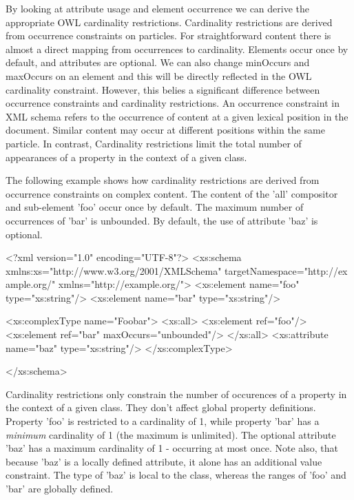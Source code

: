 By looking at attribute usage and element occurrence we can derive the appropriate OWL cardinality restrictions. Cardinality restrictions are derived from occurrence constraints on particles. For straightforward content there is almost a direct mapping from occurrences to cardinality. Elements occur once by default, and attributes are optional. We can also change minOccurs and maxOccurs on an element and this will be directly reflected in the OWL cardinality constraint. However, this belies a significant difference between occurrence constraints and cardinality restrictions. An occurrence constraint in XML schema refers to the occurrence of content at a given lexical position in the document. Similar content may occur at different positions within the same particle. In contrast, Cardinality restrictions limit the total number of appearances of a property in the context of a given class.

The following example shows how cardinality restrictions are derived from occurrence constraints on complex content. The content of the 'all' compositor and sub-\/element 'foo' occur once by default. The maximum number of occurrences of 'bar' is unbounded. By default, the use of attribute 'baz' is optional.


\begin{DoxyCodeInclude}
<?xml version="1.0" encoding="UTF-8"?>
<xs:schema xmlns:xs="http://www.w3.org/2001/XMLSchema" targetNamespace="http://ex
      ample.org/" xmlns="http://example.org/">
        <xs:element name="foo" type="xs:string"/>
        <xs:element name="bar" type="xs:string"/>
        
        <xs:complexType name="Foobar">
                <xs:all>
                        <xs:element ref="foo"/>
                        <xs:element ref="bar" maxOccurs="unbounded"/>
                </xs:all>
                <xs:attribute name="baz" type="xs:string"/>
        </xs:complexType>

</xs:schema>
\end{DoxyCodeInclude}


Cardinality restrictions only constrain the number of occurences of a property in the context of a given class. They don't affect global property definitions. Property 'foo' is restricted to a cardinality of 1, while property 'bar' has a {\itshape minimum\/} cardinality of 1 (the maximum is unlimited). The optional attribute 'baz' has a maximum cardinality of 1 -\/ occurring at most once. Note also, that because 'baz' is a locally defined attribute, it alone has an additional value constraint. The type of 'baz' is local to the class, whereas the ranges of 'foo' and 'bar' are globally defined.


